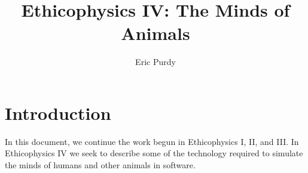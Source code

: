 \documentclass{article}
\title{Ethicophysics IV: The Minds of Animals}
\author{Eric Purdy}
\begin{document}
\maketitle

\begin{abstract}
\end{abstract}

\section{Introduction}

In this document, we continue the work begun in Ethicophysics I, II,
and III. In Ethicophysics IV we seek to describe some of the
technology required to simulate the minds of humans and other animals
in software.

 

\end{document}
